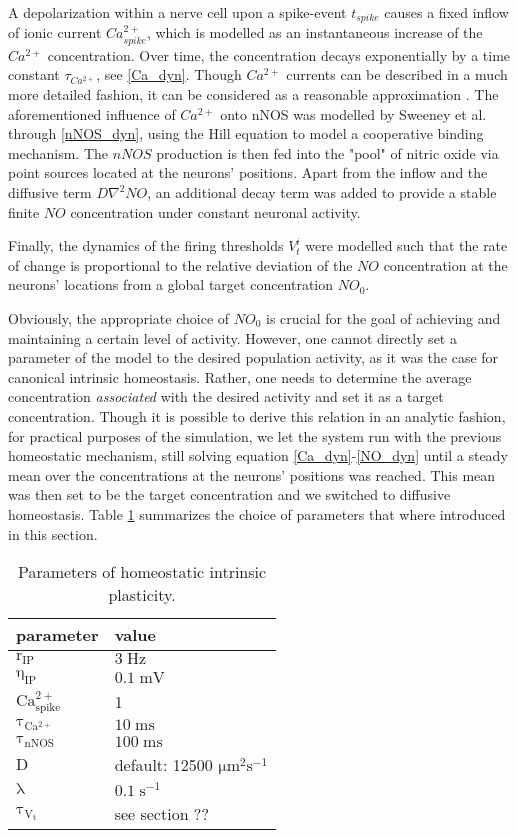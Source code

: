 \documentclass[10pt,a4paper]{article}
\begin{document}
A depolarization within a nerve cell upon a spike-event $t_{spike}$ causes a fixed inflow of ionic current $Ca^{2+}_{spike}$, which is modelled as an instantaneous increase of the $Ca^{2+}$ concentration. Over time, the concentration decays exponentially by a time constant $\tau_{Ca^{2+}}$, see \eqref{Ca_dyn}. Though $Ca^{2+}$ currents can be described in a much more detailed fashion, it can be considered as a reasonable approximation \cite[p.~198-203]{Theor_Neur_Dayan}. The aforementioned influence of $Ca^{2+}$ onto nNOS was modelled by Sweeney et al. through \eqref{nNOS_dyn}, using the Hill equation \cite{Hill_Equ} to model a cooperative binding mechanism. The $nNOS$ production is then fed into the "pool" of nitric oxide via point sources located at the neurons' positions. Apart from the inflow and the diffusive term $D \nabla^2 NO$, an additional decay term was added to provide a stable finite $NO$ concentration under constant neuronal activity.

Finally, the dynamics of the firing thresholds $V_t^i$ were modelled such that the rate of change is proportional to the relative deviation of the $NO$ concentration at the neurons' locations from a global target concentration $NO_0$. 

Obviously, the appropriate choice of $NO_0$ is crucial for the goal of achieving and maintaining a certain level of activity. However, one cannot directly set a parameter of the model to the desired population activity, as it was the case for canonical intrinsic homeostasis. Rather, one needs to determine the average concentration \textit{associated} with the desired activity and set it as a target concentration. Though it is possible to derive this relation in an analytic fashion, for practical purposes of the simulation, we let the system run with the previous homeostatic mechanism, still solving equation \eqref{Ca_dyn}-\eqref{NO_dyn} until a steady mean over the concentrations at the neurons' positions was reached. This mean was then set to be the target concentration and we switched to diffusive homeostasis. Table \ref{Params_IP} summarizes the choice of parameters that where introduced in this section.
\begin{table}
\begin{tabular}{|l|l|}
\hline
\textbf{parameter} & \textbf{value} \\
\hline
$\mathrm{r_{IP}}$ & $\mathrm{3\;Hz}$ \\
\hline
$\mathrm{\eta_{IP}}$ & $\mathrm{0.1\;mV}$ \\
\hline
$\mathrm{Ca^{2+}_{spike}}$ & 1 \\ \hline
$\mathrm{\tau_{Ca^{2+}}}$ &  $\mathrm{10\;ms}$ \\
\hline
$\mathrm{\tau_{nNOS}}$ & $\mathrm{100\;ms}$ \\
\hline
$\mathrm{D}$ & default: 12500 $\mathrm{\mu m^2 s^{-1}}$ \\
\hline 
$\mathrm{\lambda}$ & $\mathrm{0.1\;s^{-1}}$ \\
\hline
$\mathrm{\tau_{V_t}}$ & see section ?? \\
\hline
\end{tabular}
\caption{Parameters of homeostatic intrinsic plasticity.}
\label{Params_IP}
\end{table}
\end{document}
